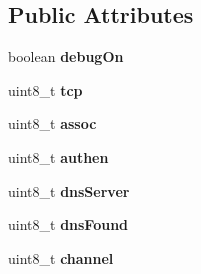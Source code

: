 \subsection*{\-Public \-Attributes}
\begin{DoxyCompactItemize}
\item 
\hypertarget{class_wi_fly_a017c503fb3097abdc27a8078731860d3}{
boolean {\bfseries debug\-On}}
\label{class_wi_fly_a017c503fb3097abdc27a8078731860d3}

\item 
\hypertarget{class_wi_fly_a5d56ad2fe6ce8a1defea5fb586ea8336}{
uint8\-\_\-t {\bfseries tcp}}
\label{class_wi_fly_a5d56ad2fe6ce8a1defea5fb586ea8336}

\item 
\hypertarget{class_wi_fly_ab0148b99761b952652ae9acffecf6964}{
uint8\-\_\-t {\bfseries assoc}}
\label{class_wi_fly_ab0148b99761b952652ae9acffecf6964}

\item 
\hypertarget{class_wi_fly_a023de46ff299a2fabf75eae651fc3ea6}{
uint8\-\_\-t {\bfseries authen}}
\label{class_wi_fly_a023de46ff299a2fabf75eae651fc3ea6}

\item 
\hypertarget{class_wi_fly_ab99109dd651f3b2146ade7f74abf1a39}{
uint8\-\_\-t {\bfseries dns\-Server}}
\label{class_wi_fly_ab99109dd651f3b2146ade7f74abf1a39}

\item 
\hypertarget{class_wi_fly_a278b163116d716fd35b68603dbc6bd81}{
uint8\-\_\-t {\bfseries dns\-Found}}
\label{class_wi_fly_a278b163116d716fd35b68603dbc6bd81}

\item 
\hypertarget{class_wi_fly_a71a7a9fb9b2ca1330d319981af0809d2}{
uint8\-\_\-t {\bfseries channel}}
\label{class_wi_fly_a71a7a9fb9b2ca1330d319981af0809d2}

\end{DoxyCompactItemize}



